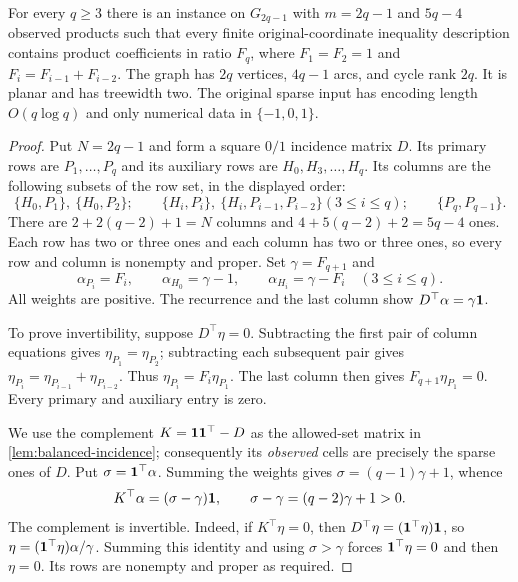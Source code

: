 \begin{theorem}\label{thm:fibonacci}
For every $q\ge3$ there is an instance on $G_{2q-1}$ with $m=2q-1$
and $5q-4$ observed products such that every finite original-coordinate
inequality description contains product coefficients in ratio $F_q$,
where $F_1=F_2=1$ and $F_i=F_{i-1}+F_{i-2}$. The graph has $2q$
vertices, $4q-1$ arcs, and cycle rank $2q$. It is planar and has
treewidth two. The original sparse input has encoding length
$O(q\log q)$ and only numerical data in $\{-1,0,1\}$.
\end{theorem}
\begin{proof}
Put $N=2q-1$ and form a square $0/1$ incidence matrix $D$.
Its primary rows are $P_1,\ldots,P_q$ and its auxiliary rows are
$H_0,H_3,\ldots,H_q$. Its columns are
the following subsets of the row set, in the displayed order:
\begin{equation}\label{eq:fibonacci-columns}
 \{H_0,P_1\},\ \{H_0,P_2\};\qquad
 \{H_i,P_i\},\ \{H_i,P_{i-1},P_{i-2}\} (3\le i\le q);
 \qquad \{P_q,P_{q-1}\}.
\end{equation}
There are $2+2(q-2)+1=N$ columns and $4+5(q-2)+2=5q-4$
ones. Each row has two or three ones and each column has two or
three ones, so every row and column is nonempty and proper.
Set $\gamma=F_{q+1}$ and
\[
 \alpha_{P_i}=F_i,\qquad
 \alpha_{H_0}=\gamma-1,\qquad
 \alpha_{H_i}=\gamma-F_i\quad(3\le i\le q).
\]
All weights are positive. The recurrence and the last column show
$D^\top\alpha=\gamma\mathbf 1$.

To prove invertibility, suppose $D^\top\eta=0$. Subtracting the
first pair of column equations gives $\eta_{P_1}=\eta_{P_2}$;
subtracting each subsequent pair gives
$\eta_{P_i}=\eta_{P_{i-1}}+\eta_{P_{i-2}}$.
Thus $\eta_{P_i}=F_i\eta_{P_1}$. The last column then gives
$F_{q+1}\eta_{P_1}=0$. Every primary and auxiliary entry is zero.

We use the complement $K=\mathbf 1\mathbf 1^\top-D$ as the allowed-set
matrix in \cref{lem:balanced-incidence}; consequently its \emph{observed}
cells are precisely the sparse ones of $D$. Put $\sigma=\mathbf 1^\top\alpha$.
Summing the weights gives $\sigma=(q-1)\gamma+1$, whence
\[
 K^\top\alpha=(\sigma-\gamma)\mathbf 1,
 \qquad \sigma-\gamma=(q-2)\gamma+1>0.
\]
The complement is invertible. Indeed, if $K^\top\eta=0$, then
$D^\top\eta=(\mathbf 1^\top\eta)\mathbf 1$, so
$\eta=(\mathbf 1^\top\eta)\alpha/\gamma$. Summing this identity and
using $\sigma>\gamma$ forces $\mathbf 1^\top\eta=0$ and then $\eta=0$.
Its rows are nonempty and proper as required.


\end{proof}
